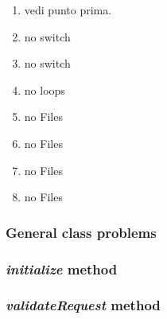 \begin{enumerate}
\begin{itemize}
                
            \end{itemize}
        \item vedi punto prima.
        \item no switch
        \item no switch
        \item no loops
        \item no Files
        \item no Files
        \item no Files
        \item no Files
    \end{enumerate}

\subsubsection{General class problems}

\subsubsection{\textit{initialize} method}

\subsubsection{\textit{validateRequest} method}